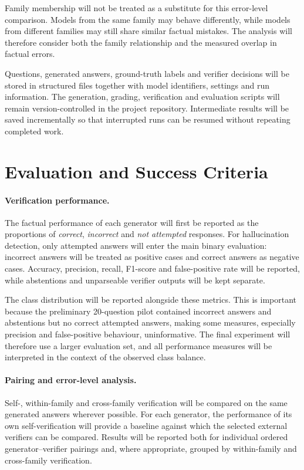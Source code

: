 \documentclass[11pt,a4paper]{article}
\begin{document}
	Family membership will not be treated as a substitute for this error-level comparison. Models from the same family may behave differently, while models from different families may still share similar factual mistakes. The analysis will therefore consider both the family relationship and the measured overlap in factual errors.
	
	Questions, generated answers, ground-truth labels and verifier decisions will be stored in structured files together with model identifiers, settings and run information. The generation, grading, verification and evaluation scripts will remain version-controlled in the project repository. Intermediate results will be saved incrementally so that interrupted runs can be resumed without repeating completed work.
	
	\section{Evaluation and Success Criteria}
	
	\paragraph{Verification performance.}
	The factual performance of each generator will first be reported as the proportions of \textit{correct}, \textit{incorrect} and \textit{not attempted} responses. For hallucination detection, only attempted answers will enter the main binary evaluation: incorrect answers will be treated as positive cases and correct answers as negative cases. Accuracy, precision, recall, F1-score and false-positive rate will be reported, while abstentions and unparseable verifier outputs will be kept separate.
	
	The class distribution will be reported alongside these metrics. This is important because the preliminary 20-question pilot contained incorrect answers and abstentions but no correct attempted answers, making some measures, especially precision and false-positive behaviour, uninformative. The final experiment will therefore use a larger evaluation set, and all performance measures will be interpreted in the context of the observed class balance.
	
	\paragraph{Pairing and error-level analysis.}
	Self-, within-family and cross-family verification will be compared on the same generated answers wherever possible. For each generator, the performance of its own self-verification will provide a baseline against which the selected external verifiers can be compared. Results will be reported both for individual ordered generator--verifier pairings and, where appropriate, grouped by within-family and cross-family verification.
	
\end{document}
